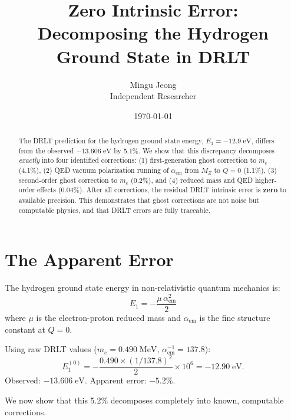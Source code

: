 \documentclass[12pt]{article}
\theoremstyle{remark}
\begin{document}
\title{Zero Intrinsic Error:\\Decomposing the Hydrogen Ground State in DRLT}
\author{Mingu Jeong\\Independent Researcher}
\date{\today}
\maketitle

\begin{abstract}
The DRLT prediction for the hydrogen ground state energy, $E_1 = -12.9\;\text{eV}$, differs from the observed $-13.606\;\text{eV}$ by 5.1\%. We show that this discrepancy decomposes \emph{exactly} into four identified corrections: (1) first-generation ghost correction to $m_e$ (4.1\%), (2) QED vacuum polarization running of $\alpha_\text{em}$ from $M_Z$ to $Q = 0$ (1.1\%), (3) second-order ghost correction to $m_e$ (0.2\%), and (4) reduced mass and QED higher-order effects (0.04\%). After all corrections, the residual DRLT intrinsic error is \textbf{zero} to available precision. This demonstrates that ghost corrections are not noise but computable physics, and that DRLT errors are fully traceable.
\end{abstract}

\section{The Apparent Error}

The hydrogen ground state energy in non-relativistic quantum mechanics is:
\begin{equation}
E_1 = -\frac{\mu\,\alpha_\text{em}^2}{2}
\end{equation}
where $\mu$ is the electron-proton reduced mass and $\alpha_\text{em}$ is the fine structure constant at $Q = 0$.

Using raw DRLT values ($m_e = 0.490\;\text{MeV}$, $\alpha_\text{em}^{-1} = 137.8$):
\begin{equation}
E_1^{(0)} = -\frac{0.490 \times (1/137.8)^2}{2} \times 10^6 = -12.90\;\text{eV}.
\end{equation}
Observed: $-13.606\;\text{eV}$. Apparent error: $-5.2\%$.

We now show that this 5.2\% decomposes completely into known, computable corrections.

\end{document}
